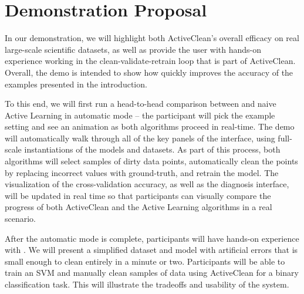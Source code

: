 \section{Demonstration Proposal}
In our demonstration, we will highlight both ActiveClean's overall efficacy on real large-scale scientific datasets, as well as provide the user with hands-on experience working in the clean-validate-retrain loop that is part of ActiveClean.  
Overall, the demo is intended to show how \sys quickly improves the accuracy of the examples presented in the introduction.

To this end, we will first run a head-to-head comparison between \sys and naive Active Learning in automatic mode -- the participant will pick the example setting and see an animation as both algorithms proceed in real-time.
The demo will automatically walk through all of the key panels of the interface, using full-scale instantiations of the models and datasets.
As part of this process, both algorithms will select samples of dirty data points, automatically clean the points by replacing incorrect values with ground-truth, and retrain the model.  
The visualization of the cross-validation accuracy, as well as the diagnosis interface, will be updated in real time so that participants can visually compare the progress of both ActiveClean and
the Active Learning algorithms in a real scenario.



After the automatic mode is complete, participants will have hands-on experience with \sys.
We will present a simplified dataset and model with artificial errors that is small enough to clean entirely in a minute or two.
Participants will be able to train an SVM and manually clean samples of data using ActiveClean for a binary classification task.
This will illustrate the tradeoffs and usability of the system.

